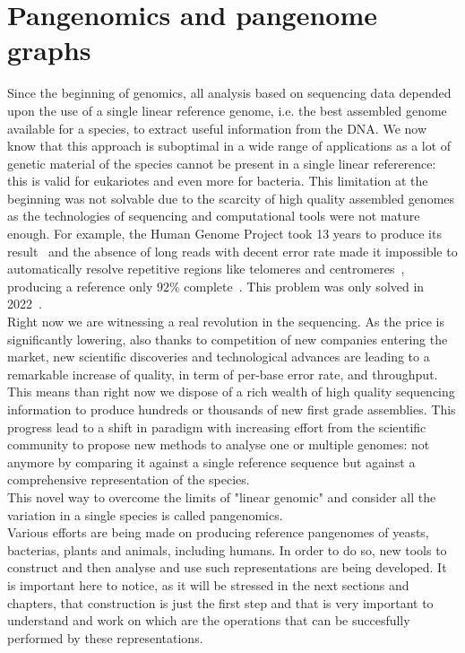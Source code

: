 \section{Pangenomics and pangenome graphs}
\label{sec:background_pangenomics}
Since the beginning of genomics, all analysis based on sequencing data depended upon the use of a single linear reference genome, i.e. the best assembled genome available for a species, to extract useful information from the DNA. We now know that this approach is suboptimal in a wide range of applications as a lot of genetic material of the species cannot be present in a single linear refererence: this is valid for eukariotes and even more for bacteria.  
This limitation at the beginning was not solvable due to the scarcity of high quality assembled genomes as the technologies of sequencing and computational tools were not mature enough. For example, the Human Genome Project took 13 years to produce its result~\cite{humangenomeproject} and the absence of long reads with decent error rate made it impossible to automatically resolve repetitive regions like telomeres and centromeres~\cite{human-pangenomics-era}, producing a reference only $92\%$ complete~\cite{t2t}. This problem was only solved in 2022~\cite{t2t}. \\
Right now we are witnessing a real revolution in the sequencing. As the price is significantly lowering, also thanks to competition of new companies entering the market, new scientific discoveries and technological advances are leading to a remarkable increase of quality, in term of per-base error rate, and throughput. This means than right now we dispose of a rich wealth of high quality sequencing information to produce hundreds or thousands of new first grade assemblies.
This progress lead to a shift in paradigm with increasing effort from the scientific community to propose new methods to analyse one or multiple genomes: not anymore by comparing it against a single reference sequence but against a comprehensive representation of the species. \\
This novel way to overcome the limits of "linear genomic" and consider all the variation in a single species is called pangenomics. \\
Various efforts are being made on producing reference pangenomes of yeasts, bacterias, plants and animals, including humans. In order to do so, new tools to construct and then analyse and use such representations are being developed. 
It is important here to notice, as it will be stressed in the next sections and chapters, that construction is just the first step and that is very important to understand and work on which are the operations that can be succesfully performed by these representations. \\

